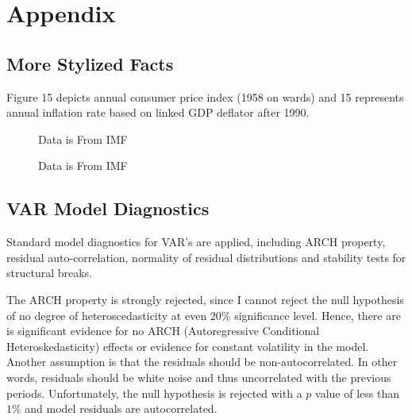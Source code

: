 \documentclass[12pt]{article}
\newcommand{\1}{\mathbbm 1}
\begin{document}
		
		
		
		
		\newpage
		
		
		
		
		
		
		
		
		
		
		
		
		\section{Appendix}
		
		\subsection{More Stylized Facts}
		
		Figure 15 depicts annual consumer price index (1958 on wards) and 15 represents annual inflation rate based on linked GDP deflator after 1990.
		
	
	\begin{figure}[H]
		\centering
		\scalebox{0.6}{}
		\hfill
		\caption{Data is From IMF}
	\end{figure}

\begin{figure}[H]
	\centering
	\scalebox{0.6}{}
	\hfill
	\caption{Data is From IMF}
\end{figure}
	

\subsection{VAR Model Diagnostics}


 Standard model diagnostics for VAR's are applied, including ARCH property, residual auto-correlation, normality of residual distributions and stability tests for structural breaks.
 
 The ARCH property is strongly rejected, since I cannot reject the null hypothesis of no degree of heteroscedasticity at even 20\% significance level. Hence, there are is significant evidence for no ARCH (Autoregressive Conditional Heteroskedasticity) effects or evidence for constant volatility in the model. Another assumption is that the residuals should be non-autocorrelated. In other words, residuals should be white noise and thus uncorrelated with the previous periods. Unfortunately, the null hypothesis is rejected with a $p$ value of less than $1\%$ and model residuals are autocorrelated.
 
\end{document}
